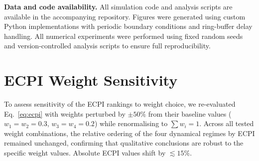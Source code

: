 \documentclass[11pt,a4paper]{article}
\begin{document}
\vspace{0.5em}
\noindent\textbf{Data and code availability.}
All simulation code and analysis scripts are available in the
accompanying repository. Figures were generated using custom
Python implementations with periodic boundary conditions and
ring-buffer delay handling. All numerical experiments were
performed using fixed random seeds and version-controlled
analysis scripts to ensure full reproducibility.

\appendix

\section{ECPI Weight Sensitivity}
\label{app:ecpi_sensitivity}

To assess sensitivity of the ECPI rankings to weight choice,
we re-evaluated Eq.~\eqref{eq:ecpi} with weights perturbed
by $\pm 50\%$ from their baseline values
($w_1=w_2=0.3$, $w_3=w_4=0.2$) while renormalising to
$\sum w_i = 1$. Across all tested weight combinations,
the relative ordering of the four dynamical regimes by ECPI
remained unchanged, confirming that qualitative conclusions
are robust to the specific weight values. Absolute ECPI
values shift by $\lesssim 15\%$.
\end{document}

